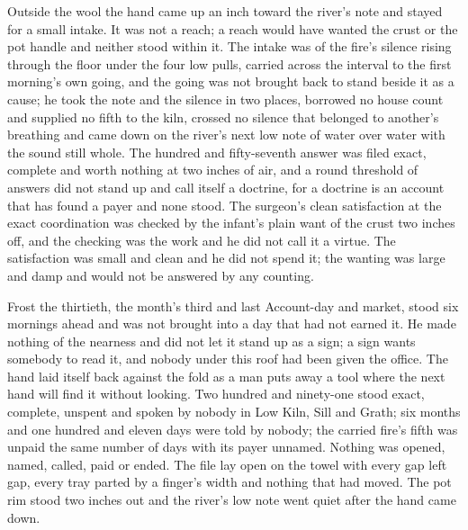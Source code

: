 \scenebreak

Outside the wool the hand came up an inch toward the river's note and stayed for a small intake. It was not a reach; a reach would have wanted the crust or the pot handle and neither stood within it. The intake was of the fire's silence rising through the floor under the four low pulls, carried across the interval to the first morning's own going, and the going was not brought back to stand beside it as a cause; he took the note and the silence in two places, borrowed no house count and supplied no fifth to the kiln, crossed no silence that belonged to another's breathing and came down on the river's next low note of water over water with the sound still whole. The hundred and fifty-seventh answer was filed exact, complete and worth nothing at two inches of air, and a round threshold of answers did not stand up and call itself a doctrine, for a doctrine is an account that has found a payer and none stood. The surgeon's clean satisfaction at the exact coordination was checked by the infant's plain want of the crust two inches off, and the checking was the work and he did not call it a virtue. The satisfaction was small and clean and he did not spend it; the wanting was large and damp and would not be answered by any counting.

Frost the thirtieth, the month's third and last Account-day and market, stood six mornings ahead and was not brought into a day that had not earned it. He made nothing of the nearness and did not let it stand up as a sign; a sign wants somebody to read it, and nobody under this roof had been given the office. The hand laid itself back against the fold as a man puts away a tool where the next hand will find it without looking. Two hundred and ninety-one stood exact, complete, unspent and spoken by nobody in Low Kiln, Sill and Grath; six months and one hundred and eleven days were told by nobody; the carried fire's fifth was unpaid the same number of days with its payer unnamed. Nothing was opened, named, called, paid or ended. The file lay open on the towel with every gap left gap, every tray parted by a finger's width and nothing that had moved. The pot rim stood two inches out and the river's low note went quiet after the hand came down.
